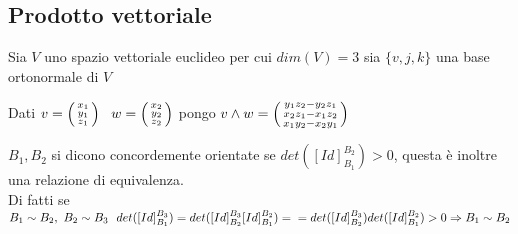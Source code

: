 \documentclass[12px]{article}
\begin{document}
	\subsection{Prodotto vettoriale}
		Sia $V$ uno spazio vettoriale euclideo per cui $dim(V) = 3$ sia $\{v,j,k\}$ una base ortonormale di $V$
		\begin{defi}
			Dati $v = \icol{x_1\\y_1\\z_1}\ \ w=\icol{x_2\\y_2\\z_2}$ pongo $v\wedge w = \left(\begin{smallmatrix}y_1z_2 - y_2z_1\\x_2z_1-x_1z_2\\x_1y_2-x_2y_1\end{smallmatrix}\right)$
		\end{defi}
		\begin{nota}
			$B_1,B_2$ si dicono concordemente orientate se $det([Id]^{B_2}_{B_1})>0$, questa è inoltre una relazione di equivalenza.\\
			Di fatti se $B_1\sim B_2, \ B_2\sim B_3\ \ det([Id]^{B_3}_{B_1})= det([Id]^{B_3}_{B_2}[Id]^{B_2}_{B_1})=\\ =det([Id]^{B_3}_{B_2})det([Id]^{B_2}_{B_1})>0 \Rightarrow B_1\sim B_2$
		\end{nota}
\end{document}

